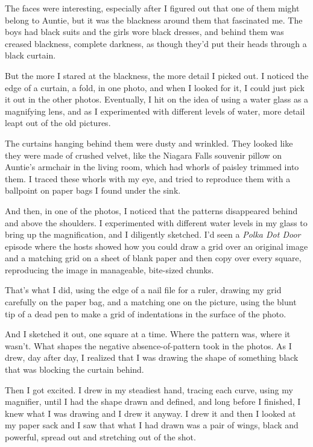 The faces were interesting, especially after I figured out that one of
them might belong to Auntie, but it was the blackness around them that
fascinated me.  The boys had black suits and the girls wore black
dresses, and behind them was creased blackness, complete darkness, as
though they'd put their heads through a black curtain.

But the more I stared at the blackness, the more detail I picked out. 
I noticed the edge of a curtain, a fold, in one photo, and when I
looked for it, I could just pick it out in the other photos. 
Eventually, I hit on the idea of using a water glass as a magnifying
lens, and as I experimented with different levels of water, more
detail leapt out of the old pictures.

The curtains hanging behind them were dusty and wrinkled.  They looked
like they were made of crushed velvet, like the Niagara Falls souvenir
pillow on Auntie's armchair in the living room, which had whorls of
paisley trimmed into them.  I traced these whorls with my eye, and
tried to reproduce them with a ballpoint on paper bags I found under
the sink.

And then, in one of the photos, I noticed that the patterns
disappeared behind and above the shoulders.  I experimented with
different water levels in my glass to bring up the magnification, and
I diligently sketched.  I'd seen a \textit{Polka Dot Door} episode
where the hosts showed how you could draw a grid over an original
image and a matching grid on a sheet of blank paper and then copy over
every square, reproducing the image in manageable, bite-sized chunks.

That's what I did, using the edge of a nail file for a ruler, drawing
my grid carefully on the paper bag, and a matching one on the picture,
using the blunt tip of a dead pen to make a grid of indentations in
the surface of the photo.

And I sketched it out, one square at a time.  Where the pattern was,
where it wasn't.  What shapes the negative absence-of-pattern took in
the photos.  As I drew, day after day, I realized that I was drawing
the shape of something black that was blocking the curtain behind.

Then I got excited.  I drew in my steadiest hand, tracing each curve,
using my magnifier, until I had the shape drawn and defined, and long
before I finished, I knew what I was drawing and I drew it anyway.  I
drew it and then I looked at my paper sack and I saw that what I had
drawn was a pair of wings, black and powerful, spread out and
stretching out of the shot.

